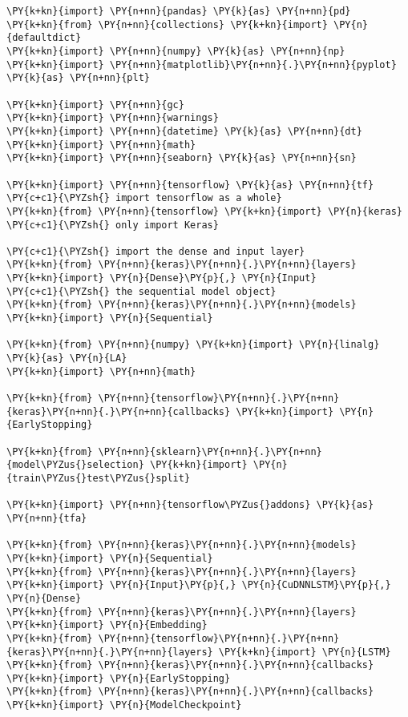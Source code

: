 
    
    \maketitle
    
    

    
    \begin{tcolorbox}[breakable, size=fbox, boxrule=1pt, pad at break*=1mm,colback=cellbackground, colframe=cellborder]
\begin{Verbatim}[commandchars=\\\{\}]
\PY{k+kn}{import} \PY{n+nn}{pandas} \PY{k}{as} \PY{n+nn}{pd}
\PY{k+kn}{from} \PY{n+nn}{collections} \PY{k+kn}{import} \PY{n}{defaultdict}
\PY{k+kn}{import} \PY{n+nn}{numpy} \PY{k}{as} \PY{n+nn}{np}
\PY{k+kn}{import} \PY{n+nn}{matplotlib}\PY{n+nn}{.}\PY{n+nn}{pyplot} \PY{k}{as} \PY{n+nn}{plt}

\PY{k+kn}{import} \PY{n+nn}{gc}
\PY{k+kn}{import} \PY{n+nn}{warnings}
\PY{k+kn}{import} \PY{n+nn}{datetime} \PY{k}{as} \PY{n+nn}{dt}
\PY{k+kn}{import} \PY{n+nn}{math}
\PY{k+kn}{import} \PY{n+nn}{seaborn} \PY{k}{as} \PY{n+nn}{sn}

\PY{k+kn}{import} \PY{n+nn}{tensorflow} \PY{k}{as} \PY{n+nn}{tf} \PY{c+c1}{\PYZsh{} import tensorflow as a whole}
\PY{k+kn}{from} \PY{n+nn}{tensorflow} \PY{k+kn}{import} \PY{n}{keras} \PY{c+c1}{\PYZsh{} only import Keras}

\PY{c+c1}{\PYZsh{} import the dense and input layer}
\PY{k+kn}{from} \PY{n+nn}{keras}\PY{n+nn}{.}\PY{n+nn}{layers} \PY{k+kn}{import} \PY{n}{Dense}\PY{p}{,} \PY{n}{Input}
\PY{c+c1}{\PYZsh{} the sequential model object}
\PY{k+kn}{from} \PY{n+nn}{keras}\PY{n+nn}{.}\PY{n+nn}{models} \PY{k+kn}{import} \PY{n}{Sequential}

\PY{k+kn}{from} \PY{n+nn}{numpy} \PY{k+kn}{import} \PY{n}{linalg} \PY{k}{as} \PY{n}{LA}
\PY{k+kn}{import} \PY{n+nn}{math}

\PY{k+kn}{from} \PY{n+nn}{tensorflow}\PY{n+nn}{.}\PY{n+nn}{keras}\PY{n+nn}{.}\PY{n+nn}{callbacks} \PY{k+kn}{import} \PY{n}{EarlyStopping}

\PY{k+kn}{from} \PY{n+nn}{sklearn}\PY{n+nn}{.}\PY{n+nn}{model\PYZus{}selection} \PY{k+kn}{import} \PY{n}{train\PYZus{}test\PYZus{}split}

\PY{k+kn}{import} \PY{n+nn}{tensorflow\PYZus{}addons} \PY{k}{as} \PY{n+nn}{tfa}

\PY{k+kn}{from} \PY{n+nn}{keras}\PY{n+nn}{.}\PY{n+nn}{models} \PY{k+kn}{import} \PY{n}{Sequential}
\PY{k+kn}{from} \PY{n+nn}{keras}\PY{n+nn}{.}\PY{n+nn}{layers} \PY{k+kn}{import} \PY{n}{Input}\PY{p}{,} \PY{n}{CuDNNLSTM}\PY{p}{,} \PY{n}{Dense}
\PY{k+kn}{from} \PY{n+nn}{keras}\PY{n+nn}{.}\PY{n+nn}{layers} \PY{k+kn}{import} \PY{n}{Embedding}
\PY{k+kn}{from} \PY{n+nn}{tensorflow}\PY{n+nn}{.}\PY{n+nn}{keras}\PY{n+nn}{.}\PY{n+nn}{layers} \PY{k+kn}{import} \PY{n}{LSTM}
\PY{k+kn}{from} \PY{n+nn}{keras}\PY{n+nn}{.}\PY{n+nn}{callbacks} \PY{k+kn}{import} \PY{n}{EarlyStopping}
\PY{k+kn}{from} \PY{n+nn}{keras}\PY{n+nn}{.}\PY{n+nn}{callbacks} \PY{k+kn}{import} \PY{n}{ModelCheckpoint}




\end{Verbatim}
\end{tcolorbox}
